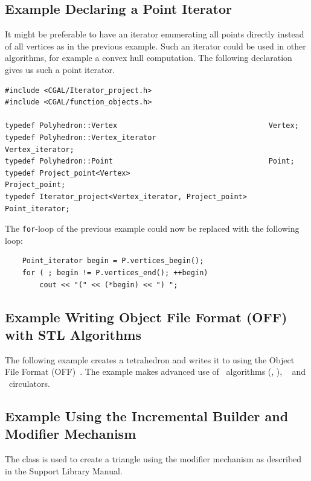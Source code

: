 
\subsection{Example Declaring a Point Iterator}

It might be preferable to have an iterator enumerating all points
directly instead of all vertices as in the previous example. Such an 
iterator could be used in other algorithms, for example a convex hull
computation. The following declaration gives us such a point iterator.

\begin{verbatim}
#include <CGAL/Iterator_project.h>
#include <CGAL/function_objects.h>

typedef Polyhedron::Vertex                                   Vertex;
typedef Polyhedron::Vertex_iterator                          Vertex_iterator;
typedef Polyhedron::Point                                    Point;
typedef Project_point<Vertex>                                Project_point;
typedef Iterator_project<Vertex_iterator, Project_point>     Point_iterator;
\end{verbatim}

The {\tt for}-loop of the previous example could now be replaced with
the following loop:

\begin{verbatim}
    Point_iterator begin = P.vertices_begin();
    for ( ; begin != P.vertices_end(); ++begin)
        cout << "(" << (*begin) << ") ";
\end{verbatim}



\subsection{Example Writing Object File Format (OFF) with STL Algorithms}

The following example creates a tetrahedron and writes it to
 using the Object File Format (OFF)~\cite{p-gmgv15-94}.
The example makes advanced use of \stl\ algorithms (,
), \stl\  and \cgal\ circulators.



\subsection{Example Using the Incremental Builder and Modifier Mechanism}

The  class is used to create
a triangle using the modifier mechanism as described in the Support
Library Manual.



